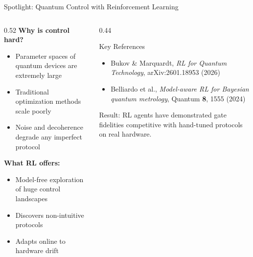 \documentclass[aspectratio=169]{beamer}
\begin{document}
\begin{frame}{Spotlight: Quantum Control with Reinforcement Learning}

  \begin{columns}[T]
    \begin{column}{0.52\textwidth}
      \textbf{Why is control hard?}
      \begin{itemize}
        \item Parameter spaces of quantum devices are extremely large
        \item Traditional optimization methods scale poorly
        \item Noise and decoherence degrade any imperfect protocol
      \end{itemize}
      \bigskip
      \textbf{What RL offers:}
      \begin{itemize}
        \item Model-free exploration of huge control landscapes
        \item Discovers non-intuitive protocols
        \item Adapts online to hardware drift
      \end{itemize}
    \end{column}
    \begin{column}{0.44\textwidth}
      \begin{block}{Key References}
        \footnotesize
        \begin{itemize}
          \item Bukov \& Marquardt,
                \emph{RL for Quantum Technology},
                arXiv:2601.18953 (2026)
          \item Belliardo et al.,
                \emph{Model-aware RL for Bayesian quantum metrology},
                Quantum \textbf{8}, 1555 (2024)
        \end{itemize}
      \end{block}
      \medskip
      \small
      \textcolor{mqblue}{Result:} RL agents have demonstrated gate
      fidelities competitive with hand-tuned protocols on real hardware.
    \end{column}
  \end{columns}

\end{frame}
\end{document}
